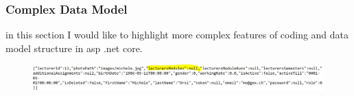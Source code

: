 \documentclass{scrartcl}
\begin{document}
\subsubsection{Complex Data Model}
in this section I would like to highlight more complex features of coding and data model structure in asp .net core.\\

\noindent                                                                %
\begin{minipage}{\linewidth}                            %
\label{visina8                                                      }%
\end{minipage}



\begin{figure}[H]
\centering
\includegraphics[width=150mm]{report_img/complex_data_problem/michele_module_null}
\caption{}
\label{blabla}
\end{figure}

\noindent                                                                %
\begin{minipage}{\linewidth}                            %
\label{visina8                                                      }%
\end{minipage}
\end{document}
